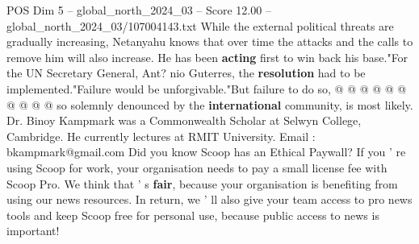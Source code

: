 \begin{textsample}{POS Dim 5 – global\_north\_2024\_03 – Score 12.00 – global\_north\_2024\_03/107004143.txt}
While the external political threats are gradually increasing, Netanyahu knows that over time the attacks and the calls to remove him will also increase.
He has been \textbf{acting} first to win back his base."For the UN Secretary General, Ant? nio Guterres, the \textbf{resolution} had to be implemented."Failure would be unforgivable."But failure to do so, @ @ @ @ @ @ @ @ @ @ so solemnly denounced by the \textbf{international} community, is most likely.
Dr.
Binoy Kampmark was a Commonwealth Scholar at Selwyn College, Cambridge.
He currently lectures at RMIT University.
Email : bkampmark@gmail.com Did you know Scoop has an Ethical Paywall?
If you ' re using Scoop for work, your organisation needs to pay a small license fee with Scoop Pro.
We think that ' s \textbf{fair}, because your organisation is benefiting from using our news resources.
In return, we ' ll also give your team access to pro news tools and keep Scoop free for personal use, because public access to news is important!

\end{textsample}

